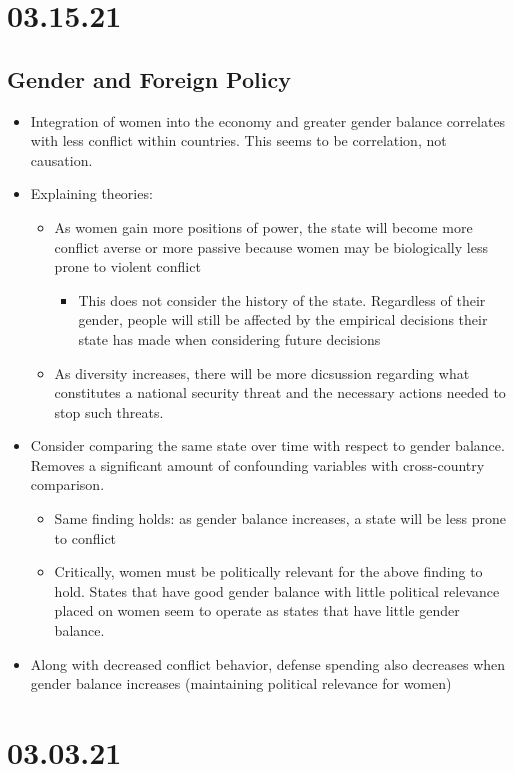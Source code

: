 \documentclass[11pt]{article}
\begin{document}
\section*{03.15.21}
\label{sec:org90538c2}
\subsection*{Gender and Foreign Policy}
\label{sec:orgf837b9b}
\begin{itemize}
\item Integration of women into the economy and greater gender balance correlates with less conflict within countries. This seems to be correlation, not causation.
\item Explaining theories:
\begin{itemize}
\item As women gain more positions of power, the state will become more conflict averse or more passive because women may be biologically less prone to violent conflict
\begin{itemize}
\item This does not consider the history of the state. Regardless of their gender, people will still be affected by the empirical decisions their state has made when considering future decisions
\end{itemize}
\item As diversity increases, there will be more dicsussion regarding what constitutes a national security threat and the necessary actions needed to stop such threats.
\end{itemize}
\item Consider comparing the same state over time with respect to gender balance. Removes a significant amount of confounding variables with cross-country comparison.
\begin{itemize}
\item Same finding holds: as gender balance increases, a state will be less prone to conflict
\item Critically, women must be politically relevant for the above finding to hold. States that have good gender balance with little political relevance placed on women seem to operate as states that have little gender balance.
\end{itemize}
\item Along with decreased conflict behavior, defense spending also decreases when gender balance increases (maintaining political relevance for women)
\end{itemize}
\section*{03.03.21}
\label{sec:org7f7cf9f}
\end{document}

